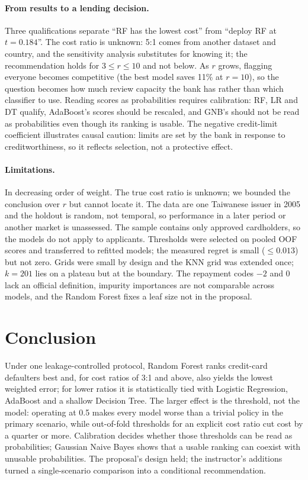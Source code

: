 \documentclass{article}
\begin{document}
\paragraph{From results to a lending decision.} Three qualifications separate ``RF has the lowest cost'' from ``deploy RF at $t=0.184$''. The cost ratio is unknown: 5:1 comes from another dataset and country, and the sensitivity analysis substitutes for knowing it; the recommendation holds for $3\le r\le10$ and not below. As $r$ grows, flagging everyone becomes competitive (the best model saves 11\% at $r=10$), so the question becomes how much review capacity the bank has rather than which classifier to use. Reading scores as probabilities requires calibration: RF, LR and DT qualify, AdaBoost's scores should be rescaled, and GNB's should not be read as probabilities even though its ranking is usable. The negative credit-limit coefficient illustrates causal caution: limits are set by the bank in response to creditworthiness, so it reflects selection, not a protective effect.

\paragraph{Limitations.} In decreasing order of weight. The true cost ratio is unknown; we bounded the conclusion over $r$ but cannot locate it. The data are one Taiwanese issuer in 2005 and the holdout is random, not temporal, so performance in a later period or another market is unassessed. The sample contains only approved cardholders, so the models do not apply to applicants. Thresholds were selected on pooled OOF scores and transferred to refitted models; the measured regret is small ($\le0.013$) but not zero. Grids were small by design and the KNN grid was extended once; $k=201$ lies on a plateau but at the boundary. The repayment codes $-2$ and 0 lack an official definition, impurity importances are not comparable across models, and the Random Forest fixes a leaf size not in the proposal.

\section{Conclusion}
Under one leakage-controlled protocol, Random Forest ranks credit-card defaulters best and, for cost ratios of 3:1 and above, also yields the lowest weighted error; for lower ratios it is statistically tied with Logistic Regression, AdaBoost and a shallow Decision Tree. The larger effect is the threshold, not the model: operating at 0.5 makes every model worse than a trivial policy in the primary scenario, while out-of-fold thresholds for an explicit cost ratio cut cost by a quarter or more. Calibration decides whether those thresholds can be read as probabilities; Gaussian Naive Bayes shows that a usable ranking can coexist with unusable probabilities. The proposal's design held; the instructor's additions turned a single-scenario comparison into a conditional recommendation.
\end{document}
